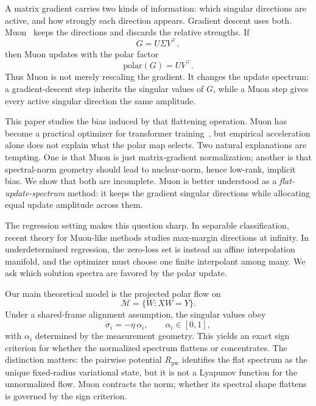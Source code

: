 \documentclass{article}
\newcommand{\polar}[1]{\mathrm{polar}(#1)}
\begin{document}



A matrix gradient carries two kinds of information: which singular directions are active, and how strongly each direction appears. Gradient descent uses both. Muon~\citep{jordan2024muon} keeps the directions and discards the relative strengths. If
\[
    G=U\Sigma V^\top,
\]
then Muon updates with the polar factor
\[
    \polar{G}=UV^\top.
\]
Thus Muon is not merely rescaling the gradient. It changes the update spectrum: a gradient-descent step inherits the singular values of \(G\), while a Muon step gives every active singular direction the same amplitude.

This paper studies the bias induced by that flattening operation. Muon has become a practical optimizer for transformer training~\citep{liu2025moonlight}, but empirical acceleration alone does not explain what the polar map selects. Two natural explanations are tempting. One is that Muon is just matrix-gradient normalization; another is that spectral-norm geometry should lead to nuclear-norm, hence low-rank, implicit bias. We show that both are incomplete. Muon is better understood as a \emph{flat-update-spectrum} method: it keeps the gradient singular directions while allocating equal update amplitude across them.

The regression setting makes this question sharp. In separable classification, recent theory for Muon-like methods studies max-margin directions at infinity. In underdetermined regression, the zero-loss set is instead an affine interpolation manifold, and the optimizer must choose one finite interpolant among many. We ask which solution spectra are favored by the polar update.

Our main theoretical model is the projected polar flow on
\[
    \mathcal M=\{W:XW=Y\}.
\]
Under a shared-frame alignment assumption, the singular values obey
\[
    \dot\sigma_i=-\eta\,\alpha_i,
    \qquad
    \alpha_i\in[0,1],
\]
with \(\alpha_i\) determined by the measurement geometry. This yields an exact sign criterion for whether the normalized spectrum flattens or concentrates. The distinction matters: the pairwise potential \(R_{\mathrm{pw}}\) identifies the flat spectrum as the unique fixed-radius variational state, but it is not a Lyapunov function for the unnormalized flow. Muon contracts the norm; whether its spectral shape flattens is governed by the sign criterion.
\end{document}
